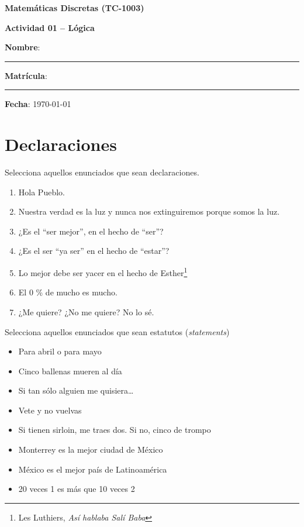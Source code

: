 \documentclass[spanish, 10pt]{article}
\begin{document}
\begin{center}
	{\Large \textbf{Matemáticas Discretas (TC-1003)}}
	
	\bigskip
	{\large \textbf{Actividad 01 -- Lógica}}
\end{center}

\bigskip
{\large \textbf{Nombre}: \rule{13.7 cm}{0.4mm}}



\bigskip
{\large \textbf{Matrícula}: \rule{5 cm}{0.4mm}} \hfill {\large \textbf{Fecha}: \today}

\bigskip


\section{Declaraciones}

Selecciona aquellos enunciados que sean declaraciones.

\vspace{3ex}

\begin{enumerate}
    \itemsep2ex
    \item Hola Pueblo.
    \item Nuestra verdad es la luz y nunca nos extinguiremos porque somos la luz.
    \item ¿Es el ``ser mejor'', en el hecho de ``ser''?
    \item ¿Es el ser ``ya ser'' en el hecho de ``estar''?
    \item Lo mejor debe ser yacer en el hecho de Esther\footnote{Les Luthiers, \textit{Así hablaba Salí Baba}}
    \item El 0 \% de mucho es mucho.
    \item ¿Me quiere? ¿No me quiere? No lo sé.
\end{enumerate}

\bigskip

Selecciona aquellos enunciados que sean estatutos (\textit{statements})

\begin{itemize}
    \item Para abril o para mayo
    \item Cinco ballenas mueren al día
    \item Si tan sólo alguien me quisiera\dots
    \item Vete y no vuelvas
    \item Si tienen sirloin, me traes dos. Si no, cinco de trompo
    \item Monterrey es la mejor ciudad de México
    \item México es el mejor país de Latinoamérica
    \item 20 veces 1 es más que 10 veces 2
\end{itemize}
\end{document}
